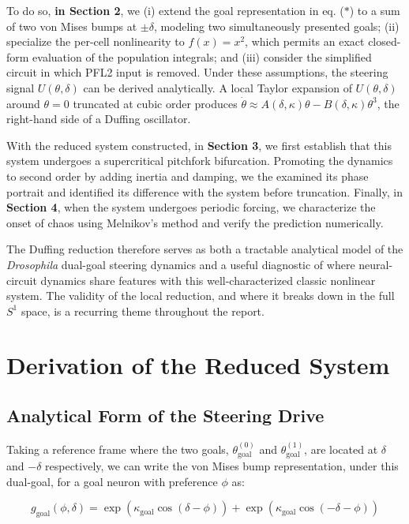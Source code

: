 \documentclass[11pt]{article}
\begin{document}
To do so, \textbf{in Section 2}, we (i) extend the goal representation in eq. ($*$) to a sum of two von Mises bumps at $\pm\delta$, modeling two simultaneously presented goals; (ii) specialize the per-cell nonlinearity to $f(x) = x^2$, which permits an exact closed-form evaluation of the population integrals; and (iii) consider the simplified circuit in which PFL2 input is removed. Under these assumptions, the steering signal $U(\theta, \delta)$ can be derived analytically. A local Taylor expansion of $U(\theta, \delta)$ around $\theta = 0$ truncated at cubic order produces $\dot\theta \approx A(\delta, \kappa)\theta - B(\delta, \kappa)\theta^3$, the right-hand side of a Duffing oscillator.

With the reduced system constructed, in \textbf{Section 3}, we first establish that this system undergoes a supercritical pitchfork bifurcation. Promoting the dynamics to second order by adding inertia and damping, we the examined its phase portrait and identified its difference with the system before truncation. Finally, in \textbf{Section 4}, when the system undergoes periodic forcing, we characterize the onset of chaos using Melnikov's method and verify the prediction numerically.

The Duffing reduction therefore serves as both a tractable analytical model of the \textit{Drosophila} dual-goal steering dynamics and a useful diagnostic of where neural-circuit dynamics share features with this well-characterized classic nonlinear system. The validity of the local reduction, and where it breaks down in the full $S^1$ space, is a recurring theme throughout the report.

\section{Derivation of the Reduced System}

\subsection{Analytical Form of the Steering Drive}

Taking a reference frame where the two goals, $\theta_{\text{goal}}^{(0)}$ and $\theta_{\text{goal}}^{(1)}$, are located at $\delta$ and $-\delta$ respectively, we can write the von Mises bump representation, under this dual-goal, for a goal neuron with preference $\phi$ as:

\begin{equation}
g_{\text{goal}}(\phi, \delta) = \exp(\kappa_{\text{goal}} \cos(\delta - \phi)) + \exp(\kappa_{\text{goal}} \cos(-\delta - \phi))
\end{equation}
\end{document}
